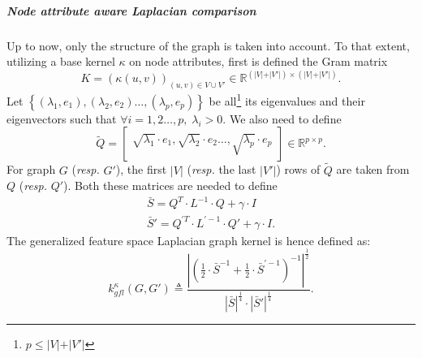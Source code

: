                 \subparagraph{Node attribute aware Laplacian comparison}
                    Up to now, only the structure of the graph is taken into account.
                    To that extent, utilizing a base kernel $\kappa$ on node attributes, first is defined the Gram matrix
                    \begin{equation*}
                        K=\left(\kappa\left(u, v\right)\right)_{(u,v) \in V \cup V'} \in \mathbb{R}^{\left(\vert V \vert + \vert V' \vert\right) \times \left(\vert V \vert + \vert V' \vert\right)}.
                    \end{equation*}
                    Let $\left\{ (\lambda_1, e_1), (\lambda_2, e_2)\dots,(\lambda_p, e_p) \right\}$ be all\footnote{$p \leq \vert V \vert + \vert V' \vert$} its eigenvalues and their eigenvectors such that $\forall i = 1, 2 \dots, p,\; \lambda_i > 0$.
                    We also need to define
                    \begin{equation*}
                        \widetilde{Q} = \begin{bmatrix}
                            \sqrt{\lambda_1}\cdot e_1, \sqrt{\lambda_2}\cdot e_2 \dots, \sqrt{\lambda_p}\cdot e_p
                        \end{bmatrix} \in \mathbb{R}^{p \times p}.
                    \end{equation*}
                    For graph \(G\) (\textit{resp.} \(G'\)), the first $\vert V \vert$ (\textit{resp.} the last $\vert V' \vert$) rows of $\widetilde{Q}$ are taken from $Q$ (\textit{resp.} $Q'$).
                    Both these matrices are needed to define 
                    \begin{align*}
                        \bar{S} = Q^T\cdot L ^{-1}\cdot Q + \gamma \cdot I\\
                        \bar{S}' = Q^{\prime T}\cdot L^{\prime -1}\cdot Q' + \gamma \cdot I.
                    \end{align*}
                    The generalized feature space Laplacian graph kernel is hence defined as:
                    \begin{equation}
                        \label{eq::generalized_feature_laplacian_kernel}
                        k^{\kappa}_{gfl}(G, G') \triangleq \frac{\left\lvert \left(\frac{1}{2} \cdot \bar{S}^{-1} + \frac{1}{2} \cdot \bar{S}^{\prime -1} \right)^{-1} \right\rvert^{\frac{1}{2}}}{\left\lvert \bar{S}\right\rvert^{\frac{1}{4}}\cdot\left\lvert \bar{S}' \right\rvert^{\frac{1}{4}}}.
                    \end{equation}

